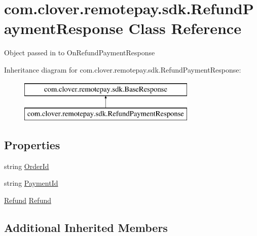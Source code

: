 \hypertarget{classcom_1_1clover_1_1remotepay_1_1sdk_1_1_refund_payment_response}{}\section{com.\+clover.\+remotepay.\+sdk.\+Refund\+Payment\+Response Class Reference}
\label{classcom_1_1clover_1_1remotepay_1_1sdk_1_1_refund_payment_response}


Object passed in to On\+Refund\+Payment\+Response  


Inheritance diagram for com.\+clover.\+remotepay.\+sdk.\+Refund\+Payment\+Response\+:\begin{figure}[H]
\begin{center}
\leavevmode
\includegraphics[height=2.000000cm]{classcom_1_1clover_1_1remotepay_1_1sdk_1_1_refund_payment_response}
\end{center}
\end{figure}
\subsection*{Properties}
\begin{DoxyCompactItemize}
\item 
string \hyperlink{classcom_1_1clover_1_1remotepay_1_1sdk_1_1_refund_payment_response_afb086e350f7151acac3e614964bcc2b1}{Order\+Id}
\item 
string \hyperlink{classcom_1_1clover_1_1remotepay_1_1sdk_1_1_refund_payment_response_a3d3940e72faa529aaeff9eca39eb2896}{Payment\+Id}
\item 
\hyperlink{classcom_1_1clover_1_1sdk_1_1v3_1_1payments_1_1_refund}{Refund} \hyperlink{classcom_1_1clover_1_1remotepay_1_1sdk_1_1_refund_payment_response_adeb3365694ecf3d5fbff2d77cf7aa7f8}{Refund}
\end{DoxyCompactItemize}
\subsection*{Additional Inherited Members}


